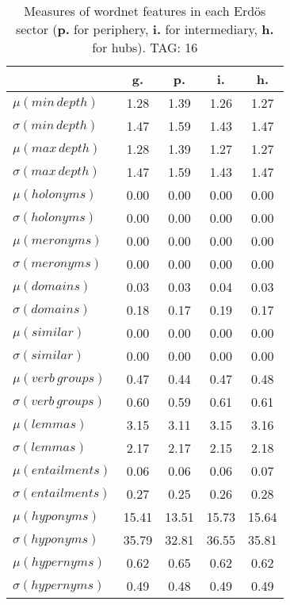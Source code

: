 \begin{table}[h!]
\begin{center}
\begin{tabular}{| l | c | c | c | c |}\hline
 & g. & p. & i. & h. \\\hline
$\mu(min\,depth)$ & 1.28  & 1.39  & 1.26  & 1.27 \\\hline
$\sigma(min\,depth)$ & 1.47  & 1.59  & 1.43  & 1.47 \\\hline
$\mu(max\,depth)$ & 1.28  & 1.39  & 1.27  & 1.27 \\\hline
$\sigma(max\,depth)$ & 1.47  & 1.59  & 1.43  & 1.47 \\\hline
$\mu(holonyms)$ & 0.00  & 0.00  & 0.00  & 0.00 \\\hline
$\sigma(holonyms)$ & 0.00  & 0.00  & 0.00  & 0.00 \\\hline
$\mu(meronyms)$ & 0.00  & 0.00  & 0.00  & 0.00 \\\hline
$\sigma(meronyms)$ & 0.00  & 0.00  & 0.00  & 0.00 \\\hline
$\mu(domains)$ & 0.03  & 0.03  & 0.04  & 0.03 \\\hline
$\sigma(domains)$ & 0.18  & 0.17  & 0.19  & 0.17 \\\hline
$\mu(similar)$ & 0.00  & 0.00  & 0.00  & 0.00 \\\hline
$\sigma(similar)$ & 0.00  & 0.00  & 0.00  & 0.00 \\\hline
$\mu(verb\,groups)$ & 0.47  & 0.44  & 0.47  & 0.48 \\\hline
$\sigma(verb\,groups)$ & 0.60  & 0.59  & 0.61  & 0.61 \\\hline
$\mu(lemmas)$ & 3.15  & 3.11  & 3.15  & 3.16 \\\hline
$\sigma(lemmas)$ & 2.17  & 2.17  & 2.15  & 2.18 \\\hline
$\mu(entailments)$ & 0.06  & 0.06  & 0.06  & 0.07 \\\hline
$\sigma(entailments)$ & 0.27  & 0.25  & 0.26  & 0.28 \\\hline
$\mu(hyponyms)$ & 15.41  & 13.51  & 15.73  & 15.64 \\\hline
$\sigma(hyponyms)$ & 35.79  & 32.81  & 36.55  & 35.81 \\\hline
$\mu(hypernyms)$ & 0.62  & 0.65  & 0.62  & 0.62 \\\hline
$\sigma(hypernyms)$ & 0.49  & 0.48  & 0.49  & 0.49 \\\hline
\end{tabular}
\caption{Measures of wordnet features in each Erd\"os sector ({{\bf p.}} for periphery, {{\bf i.}} for intermediary, {{\bf h.}} for hubs). TAG: 16}
\end{center}
\end{table}